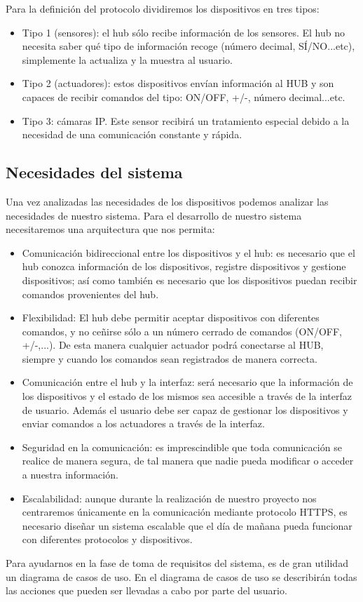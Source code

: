 Para la definición del protocolo dividiremos los dispositivos en tres tipos:
\begin{itemize}
\setlength\itemsep{6pt plus 1pt minus 1pt}
\item Tipo 1 (sensores): el hub sólo recibe información de los sensores. El hub no necesita saber qué tipo de información recoge (número decimal, SÍ/NO...etc), simplemente la actualiza y la muestra al usuario.
\item Tipo 2 (actuadores): estos dispositivos envían información al HUB y son capaces de recibir comandos del tipo: ON/OFF, +/-, número decimal...etc.
\item Tipo 3: cámaras IP. Este sensor recibirá un tratamiento especial debido a la necesidad de una comunicación constante y rápida.
\end{itemize}
\subsection{Necesidades del sistema}
Una vez analizadas las necesidades de los dispositivos podemos analizar las necesidades de nuestro sistema.
Para el desarrollo de nuestro sistema necesitaremos una arquitectura que nos permita:
\begin{itemize}
\setlength\itemsep{6pt plus 1pt minus 1pt}
\item Comunicación bidireccional entre los dispositivos y el hub: es necesario que el hub conozca información de los dispositivos, 
registre dispositivos y gestione dispositivos; así como también es necesario que los dispositivos puedan recibir comandos provenientes
del hub.
\item Flexibilidad: El hub debe permitir aceptar dispositivos con diferentes comandos, y no ceñirse sólo a un número cerrado de comandos (ON/OFF, +/-,...).
De esta manera cualquier actuador podrá conectarse al HUB, siempre y cuando los comandos sean registrados de manera correcta.
\item Comunicación entre el hub y la interfaz: será necesario que la información de los dispositivos y el estado de los mismos sea accesible
a través de la interfaz de usuario. Además el usuario debe ser capaz de gestionar los dispositivos y enviar comandos a los actuadores
a través de la interfaz.
\item Seguridad en la comunicación: es imprescindible que toda comunicación se realice de manera segura, de tal manera que nadie pueda modificar o
acceder a nuestra información.
\item Escalabilidad: aunque durante la realización de nuestro proyecto nos centraremos únicamente en la comunicación mediante protocolo HTTPS, 
es necesario diseñar un sistema escalable que el día de mañana pueda funcionar con diferentes protocolos y dispositivos.
\end{itemize}
Para ayudarnos en la fase de toma de requisitos del sistema, es de gran utilidad un diagrama de casos de uso. En el diagrama de casos de uso se describirán
todas las acciones que pueden ser llevadas a cabo por parte del usuario.
